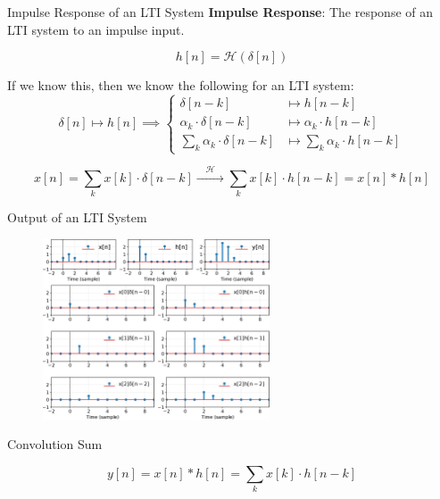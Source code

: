 \documentclass[aspectratio=169]{beamer}
\begin{document}
\begin{frame}[t]{Impulse Response of an LTI System}
\textbf{Impulse Response}: The response of an LTI system to an impulse input.

\[ h[n]  = \mathcal{H}\left( \delta[n] \right) \]

If we know this, then we know the following for an LTI system:
\[ \delta[n] \mapsto h[n] \implies \begin{cases}
\delta[n - k] &\mapsto h[n - k] \\
\alpha_k \cdot \delta[n - k] &\mapsto \alpha_k \cdot h[n - k] \\
\sum_k \alpha_k \cdot \delta[n - k] &\mapsto \sum_k\alpha_k \cdot h[n - k]
\end{cases} \]

\[ x[n] =\sum_k x[k] \cdot \delta[n - k] \xrightarrow{\quad \mathcal{H} \quad} \sum_k x[k] \cdot h[n - k] = x[n] * h[n] \]
\end{frame}

\begin{frame}[t]{Output of an LTI System}
\begin{figure}
\includegraphics[width=0.6\textwidth]{img/convdemo1.eps}
\end{figure}
\end{frame}

\begin{frame}[t]{Convolution Sum}
\begin{Large}
\[ y[n] = x[n] * h[n] = \sum_k x[k] \cdot h[n - k] \]
\end{Large}
\end{frame}
\end{document}
